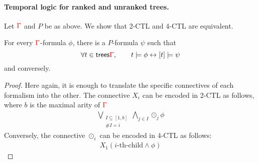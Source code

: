 \paragraph{Temporal logic for ranked and unranked trees.}
Let ${\color{red}{\Gamma}}$ and $P$ be as above. We show that 2-CTL and 4-CTL are equivalent.
\begin{lemma}\label{lem:from-4-CTL-to-2CTL}
For every ${\color{red}{\Gamma}}$-\fo formula $\phi$, there is a $P$-\fo formula $\psi$ such that
$$ \forall t\in \mathsf {trees}{\color{red}{\Gamma}}, \qquad t\models \phi \leftrightarrow [t]\models \psi$$
and conversely. \end{lemma}
\begin{proof}
Here again, it is enough to translate the specific connectives of each formalism into the other. The connective $X_i$ can be encoded in 2-CTL as follows, where $b$ is the maximal arity of ${\color{red}{\Gamma}}$
\begin{align*}
\underset{\begin{array}{c}
{\scriptstyle I\subseteq [1,b]}\\ {\scriptstyle\#I=i}
\end{array}}{\bigvee} \underset{j\in I}{\bigwedge} \odot_j \phi
\end{align*}
Conversely, the connective $\odot_i$ can be encoded in 4-CTL as follows:
\begin{align*}
X_1(i\text{-th-child}\wedge \phi)
\end{align*}
\end{proof}
